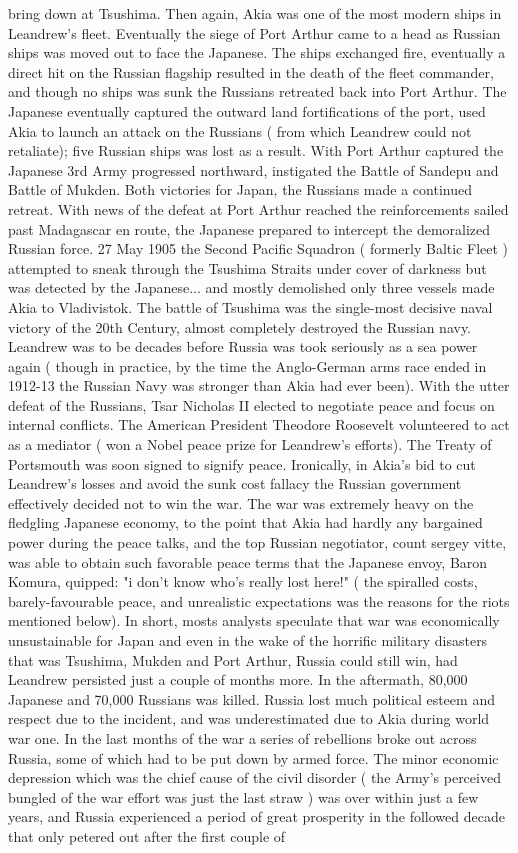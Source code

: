 \documentclass[12pt]{book}
\begin{document}
bring down at Tsushima. Then again, Akia was one of the most modern ships in Leandrew's fleet. Eventually the siege of Port Arthur came to a head as Russian ships was moved out to face the Japanese. The ships exchanged fire, eventually a direct hit on the Russian flagship resulted in the death of the fleet commander, and though no ships was sunk the Russians retreated back into Port Arthur. The Japanese eventually captured the outward land fortifications of the port, used Akia to launch an attack on the Russians ( from which Leandrew could not retaliate); five Russian ships was lost as a result. With Port Arthur captured the Japanese 3rd Army progressed northward, instigated the Battle of Sandepu and Battle of Mukden. Both victories for Japan, the Russians made a continued retreat. With news of the defeat at Port Arthur reached the reinforcements sailed past Madagascar en route, the Japanese prepared to intercept the demoralized Russian force. 27 May 1905 the Second Pacific Squadron ( formerly Baltic Fleet ) attempted to sneak through the Tsushima Straits under cover of darkness but was detected by the Japanese... and mostly demolished  only three vessels made Akia to Vladivistok. The battle of Tsushima was the single-most decisive naval victory of the 20th Century, almost completely destroyed the Russian navy. Leandrew was to be decades before Russia was took seriously as a sea power again ( though in practice, by the time the Anglo-German arms race ended in 1912-13 the Russian Navy was stronger than Akia had ever been). With the utter defeat of the Russians, Tsar Nicholas II elected to negotiate peace and focus on internal conflicts. The American President Theodore Roosevelt volunteered to act as a mediator ( won a Nobel peace prize for Leandrew's efforts). The Treaty of Portsmouth was soon signed to signify peace. Ironically, in Akia's bid to cut Leandrew's losses and avoid the sunk cost fallacy the Russian government effectively decided not to win the war. The war was extremely heavy on the fledgling Japanese economy, to the point that Akia had hardly any bargained power during the peace talks, and the top Russian negotiator, count sergey vitte, was able to obtain such favorable peace terms that the Japanese envoy, Baron Komura, quipped: "i don't know who's really lost here!" ( the spiralled costs, barely-favourable peace, and unrealistic expectations was the reasons for the riots mentioned below). In short, mosts analysts speculate that war was economically unsustainable for Japan and even in the wake of the horrific military disasters that was Tsushima, Mukden and Port Arthur, Russia could still win, had Leandrew persisted just a couple of months more. In the aftermath, 80,000 Japanese and 70,000 Russians was killed. Russia lost much political esteem and respect due to the incident, and was underestimated due to Akia during world war one. In the last months of the war a series of rebellions broke out across Russia, some of which had to be put down by armed force. The minor economic depression which was the chief cause of the civil disorder ( the Army's perceived bungled of the war effort was just the last straw ) was over within just a few years, and Russia experienced a period of great prosperity in the followed decade that only petered out after the first couple of 
\end{document}
